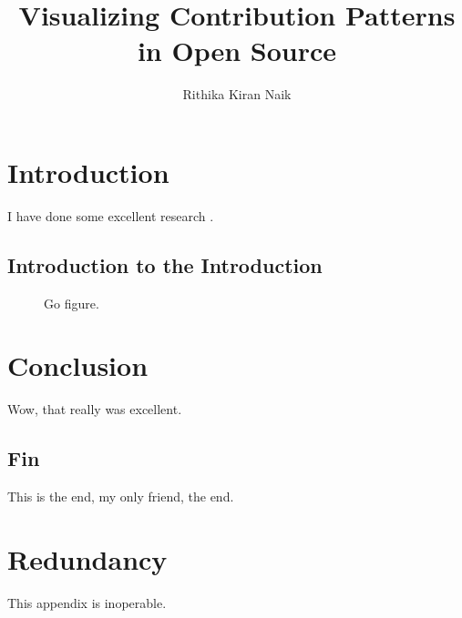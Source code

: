 \documentclass[double,11pt]{beavtex}
\title{Visualizing Contribution Patterns in Open Source}
\author{Rithika Kiran Naik}
\begin{document}
\maketitle

\mainmatter

\chapter{Introduction}
I have done some excellent research \cite{matrix}.
\section{Introduction to the Introduction}
\begin{figure}[!ht]
\centering
{}
\caption{Go figure.}
\end{figure}


\chapter{Conclusion}
Wow, that really was excellent.
\section{Fin}
This is the end, my only friend, the end.





\appendix
\chapter{Redundancy}
This appendix is inoperable.
\end{document}
